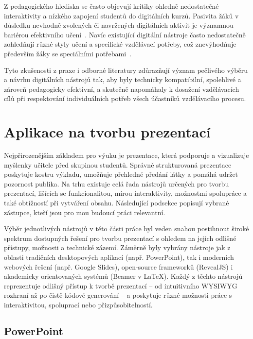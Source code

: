 Z pedagogického hlediska se často objevují kritiky ohledně nedostatečné interaktivity a nízkého zapojení studentů do digitálních kurzů.
Pasivita žáků v důsledku nevhodně zvolených či navržených digitálních aktivit je významnou bariérou efektivního učení~\cite{edsembli2020}. 
Navíc existující digitální nástroje často nedostatečně zohledňují různé styly učení a specifické vzdělávací potřeby, což znevýhodňuje především žáky se speciálními potřebami~\cite{altamira2025}.

Tyto zkušenosti z praxe i odborné literatury zdůrazňují význam pečlivého výběru a návrhu digitálních nástrojů tak, aby byly technicky kompatibilní, spolehlivé a zároveň pedagogicky efektivní, a skutečně napomáhaly k dosažení vzdělávacích cílů při respektování individuálních potřeb všech účastníků vzdělávacího procesu.

\section{Aplikace na tvorbu prezentací}\label{text:analyza/prezentace}

Nejpřirozenějším základem pro výuku je prezentace, která podporuje a vizualizuje myšlenky učitele před skupinou studentů.
Správně strukturovaná prezentace poskytuje kostru výkladu, umožňuje přehledné předání látky a pomáhá udržet pozornost publika.
Na trhu existuje celá řada nástrojů určených pro tvorbu prezentací, lišících se funkcionalitou, mírou interaktivity, možnostmi spolupráce a také obtížností při vytváření obsahu.
Následující podsekce popisují vybrané zástupce, kteří jsou pro mou budoucí práci relevantní.

Výběr jednotlivých nástrojů v této části práce byl veden snahou postihnout široké spektrum dostupných řešení pro tvorbu prezentací s ohledem na jejich odlišné přístupy, možnosti a technické zázemí. 
Záměrně byly vybrány nástroje jak z oblasti tradičních desktopových aplikací (např. PowerPoint), tak i moderních webových řešení (např. Google Slides), open-source frameworků (RevealJS) i akademicky orientovaných systémů (Beamer v \LaTeX). 
Každý z těchto nástrojů reprezentuje odlišný přístup k tvorbě prezentací -- od intuitivního WYSIWYG rozhraní až po čistě kódové generování -- a poskytuje různé možnosti práce s interaktivitou, spoluprací nebo přizpůsobitelností.

\subsection{PowerPoint}

